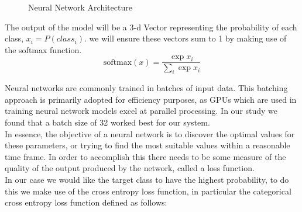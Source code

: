 \documentclass{article}
\begin{document}
\begin{figure}[ht]
    \centering
    \caption{Neural Network Architecture}
\end{figure}

The output of the model will be a 3-d Vector representing the probability of each class, $x_i = P(class_i)$. we will ensure these vectors sum to 1 by making use of the softmax function.\\

\begin{equation}
    \text{softmax}(x) = \frac{\exp{x_i}}{\sum_i{\exp x_i}}
\end{equation}

Neural networks are commonly trained in batches of input data. This batching approach is primarily adopted for efficiency purposes, as GPUs which are used in training neural network models excel at parallel processing. In our study we found that a batch size of 32 worked best for our system. \\

In essence, the objective of a neural network is to discover the optimal values for these parameters, or trying to find the most suitable values within a reasonable time frame. In order to accomplish this there needs to be some measure of the quality of the output produced by the network, called a loss function.\\

In our case we would like the target class to have the highest probability, to do this we make use of the cross entropy loss function, in particular the categorical cross entropy loss function defined as follows:
\end{document}
